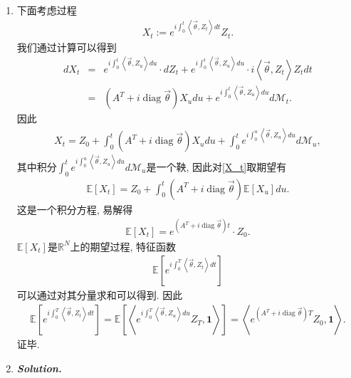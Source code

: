 \documentclass[12pt]{article}
\makeatletter
\newtheorem*{Solution}{\itshape Solution}
\renewenvironment{Solution}[1][\itshape Solution.]{%
  \par\noindent\textbf{#1}\quad\CJKfamily{SimSun}%
}{\par}
\renewenvironment{proof}[1][\proofname]{\par
  \pushQED{\qed}%
  \normalfont \topsep6\p@\@plus6\p@\relax
  \trivlist
  \item[\hskip\labelsep
        \bfseries\itshape
    #1\@addpunct{.}]\ignorespaces
}{%
  \popQED\endtrivlist\@endpefalse
}
\makeatother
\begin{document}
\begin{enumerate}
\begin{proof}
下面考虑过程
\begin{eqnarray}
  X_t :=  e^{i  \int_0^t \left \langle\vec{\theta},Z_t  \right \rangle dt}Z_t. 
\end{eqnarray}
我们通过计算可以得到
\begin{eqnarray*}
    d X_t & =& e^{i\int_0^t\left \langle\vec{\theta}, Z_u\right \rangle d u}\cdot d Z_t+e^{ i\int_0^t\left \langle\vec{\theta}, Z_u\right \rangle d u} \cdot i\left \langle\vec{\theta}, Z_t\right \rangle Z_t d t \\
    & =&\left(A^T +i \operatorname{diag} \vec{\theta}\right) X_u d u+e^{ i\int_0^t\left \langle\vec{\theta}, Z_u\right \rangle d u} d \mathcal{M}_t.
\end{eqnarray*}
因此
\begin{eqnarray}
  X_t = Z_0 + \int_0 ^ t \left(A^T +i \operatorname{diag} \vec{\theta}\right) X_u d u + \int_0^t e^{ i\int_0^u\left \langle\vec{\theta}, Z_u\right \rangle d u} d \mathcal{M}_u,\label{X_t}
\end{eqnarray}
其中积分$ \int_0^t e^{ i\int_0^u\left \langle\vec{\theta}, Z_u\right \rangle d u} d \mathcal{M}_u$是一个鞅, 因此对\eqref{X_t}取期望有
\begin{eqnarray*}
  \mathbb{E}\left[X_t\right] = Z_0 + \int_0 ^ t \left(A^T +i \operatorname{diag} \vec{\theta}\right)  \mathbb{E}\left[X_u\right]  d u.
\end{eqnarray*}
这是一个积分方程, 易解得
\begin{eqnarray}
  \mathbb{E}\left[X_t\right] =  e^{\left(A^T + i \operatorname{diag} \vec{\theta}\right) t}\cdot Z_0. \label{ode Solution}
\end{eqnarray}
$ \mathbb{E}\left[X_t\right]$是$\mathbb{R}^N$上的期望过程, 特征函数
\begin{eqnarray*}
  \mathbb{E}\left[ e^{i \int_0^T \left \langle\vec{\theta},Z_t  \right \rangle dt} \right]
\end{eqnarray*}
可以通过对其分量求和可以得到. 因此
\begin{eqnarray}
  \mathbb{E}\left[ e^{i \int_0^T \left \langle\vec{\theta},Z_t  \right \rangle dt} \right] = \mathbb{E}\left[ \left \langle e^{i \int_0^T \left \langle\vec{\theta},Z_u  \right \rangle du} Z_T, \mathbf{1} \right \rangle \right] =\left \langle e^{\left(A^T + i \operatorname{diag} \vec{\theta}\right) T} Z_0, \mathbf{1} \right \rangle.
\end{eqnarray}
证毕.
  \end{proof}
  \item \begin{Solution}

\end{Solution}
\end{enumerate}
\end{document}
